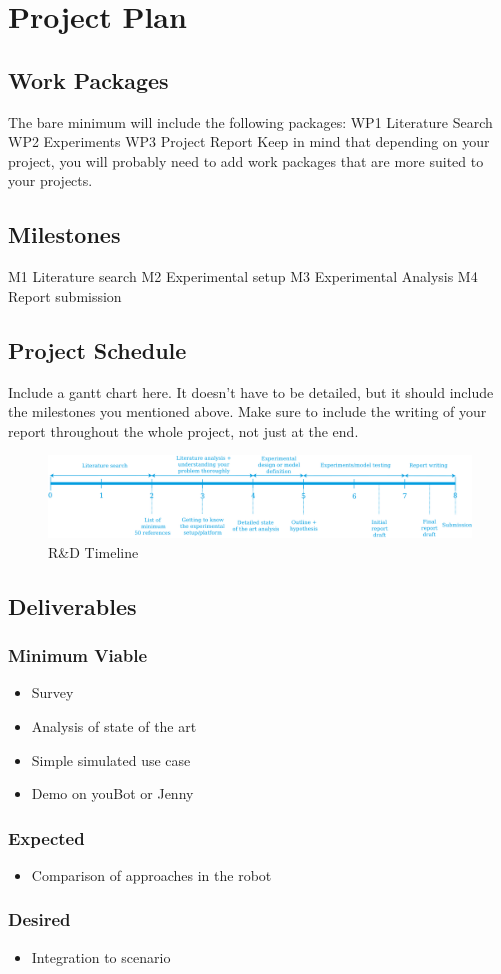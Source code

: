 \section{Project Plan}
\subsection{Work Packages}
	The bare minimum will include the following packages:
	WP1 Literature Search
	WP2 Experiments
	WP3 Project Report
	Keep in mind that depending on your project, you will probably need to add work packages that are more suited to your projects.
	\subsection{Milestones}
	M1 Literature search
	M2 Experimental setup
	M3 Experimental Analysis
	M4 Report submission
	\subsection{Project Schedule}
	Include a gantt chart here. It doesn't have to be detailed, but it should include the milestones you mentioned above. Make sure to include the writing of your report throughout the whole project, not just at the end.
	\begin{figure}[htbp] %
   \centering
   \includegraphics[width=15cm]{images/rnd_deliverable_timeline.png} 
   \caption{R\&D Timeline}
   \label{fig:ai}
\end{figure}
	\subsection{Deliverables}
		\subsubsection{Minimum Viable}
		\begin{itemize}
			\item Survey
			\item Analysis of state of the art
			\item Simple simulated use case
			\item Demo on youBot or Jenny
		\end{itemize}
		\subsubsection{Expected}
		\begin{itemize}
			\item Comparison of approaches in the robot
		\end{itemize}
		\subsubsection{Desired}
		\begin{itemize}
			\item Integration to scenario
		\end{itemize}
